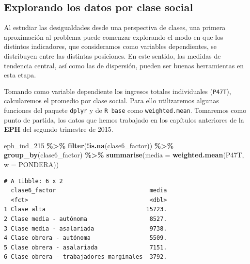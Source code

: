 \documentclass[
]{article}
\newenvironment{Shaded}{\begin{snugshade}}{\end{snugshade}}
\newcommand{\AttributeTok}[1]{\textcolor[rgb]{0.13,0.29,0.53}{#1}}
\newcommand{\FunctionTok}[1]{\textcolor[rgb]{0.13,0.29,0.53}{\textbf{#1}}}
\newcommand{\NormalTok}[1]{#1}
\newcommand{\SpecialCharTok}[1]{\textcolor[rgb]{0.81,0.36,0.00}{\textbf{#1}}}
\begin{document}
\hypertarget{explorando}{%
\subsection{Explorando los datos por clase social}\label{explorando}}

Al estudiar las desigualdades desde una perspectiva de clases, una primera aproximación al problema puede comenzar explorando el modo en que los distintos indicadores, que consideramos como variables dependientes, se distribuyen entre las distintas posiciones. En este sentido, las medidas de tendencia central, así como las de dispersión, pueden ser buenas herramientas en esta etapa.

Tomando como variable dependiente los ingresos totales individuales (\texttt{P47T}), calcularemos el promedio por clase social. Para ello utilizaremos algunas funciones del paquete \texttt{dplyr} y de \texttt{R\ base} como \texttt{weighted.mean}. Tomaremos como punto de partida, los datos que hemos trabajado en los capítulos anteriores de la \textbf{EPH} del segundo trimestre de 2015.

\begin{Shaded}
\begin{Highlighting}[]
\NormalTok{eph\_ind\_215 }\SpecialCharTok{\%\textgreater{}\%}
    \FunctionTok{filter}\NormalTok{(}\SpecialCharTok{!}\FunctionTok{is.na}\NormalTok{(clase6\_factor)) }\SpecialCharTok{\%\textgreater{}\%}
    \FunctionTok{group\_by}\NormalTok{(clase6\_factor) }\SpecialCharTok{\%\textgreater{}\%}
    \FunctionTok{summarise}\NormalTok{(}\AttributeTok{media =} \FunctionTok{weighted.mean}\NormalTok{(P47T, }\AttributeTok{w =}\NormalTok{ PONDERA))}
\end{Highlighting}
\end{Shaded}

\begin{verbatim}
# A tibble: 6 x 2
  clase6_factor                           media
  <fct>                                   <dbl>
1 Clase alta                             15723.
2 Clase media - autónoma                  8527.
3 Clase media - asalariada                9738.
4 Clase obrera - autónoma                 5509.
5 Clase obrera - asalariada               7151.
6 Clase obrera - trabajadores marginales  3792.
\end{verbatim}
\end{document}
